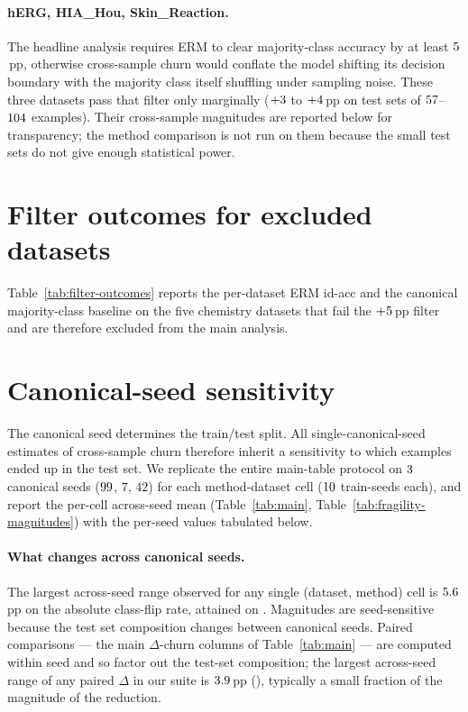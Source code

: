 \paragraph{hERG, HIA\_Hou, Skin\_Reaction.}
The headline analysis requires ERM to clear majority-class
accuracy by at least $5$\,pp, otherwise cross-sample
churn would conflate the model shifting its decision boundary with
the majority class itself shuffling under sampling noise.  These
three datasets pass that filter only marginally
($+3$ to $+4$\,pp on test sets of
$57$--$104$ examples).  Their
cross-sample magnitudes are reported below for transparency; the
method comparison is not run on them because the small test sets do
not give enough statistical power.



\section{Filter outcomes for excluded datasets}
\label{app:filter_outcomes}

Table~\ref{tab:filter-outcomes} reports the per-dataset ERM id-acc
and the canonical majority-class baseline on the five chemistry
datasets that fail the $+5$\,pp filter and are
therefore excluded from the main analysis.



\section{Canonical-seed sensitivity}
\label{app:seed_sensitivity}

The canonical seed determines the train/test split.  All
single-canonical-seed estimates of cross-sample churn therefore
inherit a sensitivity to which examples ended up in the test set.
We replicate the entire main-table protocol on $3$
canonical seeds ($99$, $7$, $42$) for each method-dataset
cell ($10$ train-seeds each), and report the per-cell across-seed
mean (Table~\ref{tab:main}, Table~\ref{tab:fragility-magnitudes}) with
the per-seed values tabulated below.

\paragraph{What changes across canonical seeds.}
The largest across-seed range observed for any single
(dataset, method) cell is $5.6$\,pp on the
absolute class-flip rate, attained on \maxAcrossSeedChurnSpreadCell.
Magnitudes are seed-sensitive because the test set composition
changes between canonical seeds.  Paired comparisons --- the main
$\Delta$-churn columns of Table~\ref{tab:main} --- are computed within
seed and so factor out the test-set composition; the largest
across-seed range of any paired $\Delta$ in our suite is
$3.9$\,pp (\maxAcrossSeedDeltaSpreadCell),
typically a small fraction of the magnitude of the reduction.

